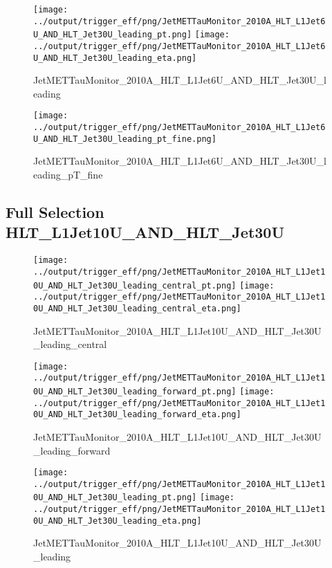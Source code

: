 \documentclass[11pt]{article}
\begin{document}
\begin{figure}[ht]
\centering
\texttt{[image: ../output/trigger\_eff/png/JetMETTauMonitor\_2010A\_HLT\_L1Jet6U\_AND\_HLT\_Jet30U\_leading\_pt.png]}
\texttt{[image: ../output/trigger\_eff/png/JetMETTauMonitor\_2010A\_HLT\_L1Jet6U\_AND\_HLT\_Jet30U\_leading\_eta.png]}
\caption{JetMETTauMonitor\_2010A\_HLT\_L1Jet6U\_AND\_HLT\_Jet30U\_leading}
\label{fig:jetmettaumon_HLT_L1Jet6U_AND_HLT_Jet30U_leading}
\end{figure}

\begin{figure}[ht]
\centering
\texttt{[image: ../output/trigger\_eff/png/JetMETTauMonitor\_2010A\_HLT\_L1Jet6U\_AND\_HLT\_Jet30U\_leading\_pt\_fine.png]}
\caption{JetMETTauMonitor\_2010A\_HLT\_L1Jet6U\_AND\_HLT\_Jet30U\_leading\_pT\_fine}
\label{fig:jetmettaumon_HLT_L1Jet6U_AND_HLT_Jet30U_leading_pT_fine}
\end{figure}
\clearpage


\newpage
\subsection{Full Selection HLT\_L1Jet10U\_AND\_HLT\_Jet30U}
\begin{figure}[ht]
\centering
\texttt{[image: ../output/trigger\_eff/png/JetMETTauMonitor\_2010A\_HLT\_L1Jet10U\_AND\_HLT\_Jet30U\_leading\_central\_pt.png]}
\texttt{[image: ../output/trigger\_eff/png/JetMETTauMonitor\_2010A\_HLT\_L1Jet10U\_AND\_HLT\_Jet30U\_leading\_central\_eta.png]}
\caption{JetMETTauMonitor\_2010A\_HLT\_L1Jet10U\_AND\_HLT\_Jet30U\_leading\_central}
\label{fig:jetmettaumon_HLT_L1Jet10U_AND_HLT_Jet30U_leading_central}
\end{figure}

\begin{figure}[ht]
\centering
\texttt{[image: ../output/trigger\_eff/png/JetMETTauMonitor\_2010A\_HLT\_L1Jet10U\_AND\_HLT\_Jet30U\_leading\_forward\_pt.png]}
\texttt{[image: ../output/trigger\_eff/png/JetMETTauMonitor\_2010A\_HLT\_L1Jet10U\_AND\_HLT\_Jet30U\_leading\_forward\_eta.png]}
\caption{JetMETTauMonitor\_2010A\_HLT\_L1Jet10U\_AND\_HLT\_Jet30U\_leading\_forward}
\label{fig:jetmettaumon_HLT_L1Jet10U_AND_HLT_Jet30U_leading_forward}
\end{figure}

\begin{figure}[ht]
\centering
\texttt{[image: ../output/trigger\_eff/png/JetMETTauMonitor\_2010A\_HLT\_L1Jet10U\_AND\_HLT\_Jet30U\_leading\_pt.png]}
\texttt{[image: ../output/trigger\_eff/png/JetMETTauMonitor\_2010A\_HLT\_L1Jet10U\_AND\_HLT\_Jet30U\_leading\_eta.png]}
\caption{JetMETTauMonitor\_2010A\_HLT\_L1Jet10U\_AND\_HLT\_Jet30U\_leading}
\label{fig:jetmettaumon_HLT_L1Jet10U_AND_HLT_Jet30U_leading}
\end{figure}
\end{document}
